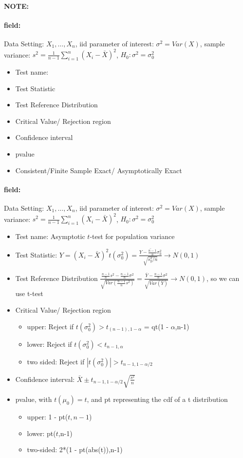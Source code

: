 \documentclass[12pt]{article}
\newenvironment{note}{\paragraph{NOTE:}}{}
\newenvironment{field}{\paragraph{field:}}{}
\begin{document}
\begin{note}
 \begin{field}
  Data Setting: $X_1, \ldots, X_n$, iid parameter of interest: $\sigma^2 = Var(X)$, sample variance: $s^2 = \frac{1}{n-1} \sum_{i=1}^n(X_i - \bar{X})^2$, $H_0: \sigma^2 = \sigma_0^2$
  \begin{itemize}
   \item Test name:
   \item Test Statistic
   \item Test Reference Distribution
   \item Critical Value/ Rejection region
   \item Confidence interval
   \item pvalue
   \item Consistent/Finite Sample Exact/ Asymptotically Exact
  \end{itemize}
 \end{field}
 \begin{field}
  Data Setting: $X_1, \ldots, X_n$, iid parameter of interest: $\sigma^2 = Var(X)$, sample variance: $s^2 = \frac{1}{n-1} \sum_{i=1}^n(X_i - \bar{X})^2$, $H_0: \sigma^2 = \sigma_0^2$
  \begin{itemize}
   \item Test name: Asymptotic $t$-test for population variance
   \item Test Statistic: $Y = (X_i - \bar{X})^2 t(\sigma_0^2)  = \frac{\bar{Y - \frac{n-1}{n}\sigma_0^2}}{\sqrt{s_y^2/n}} \to N(0,1)$
   \item Test Reference Distribution $ \frac{\frac{n-1}{n}s^2 - \frac{n-1}{n}\sigma^2}{\sqrt{Var(\frac{n-1}{n}s^2)}} = \frac{\bar{Y}- \frac{n-1}{n}\sigma^2}{\sqrt{Var(\bar{Y})}} \to N(0,1)$, so we can use t-test
   \item Critical Value/ Rejection region
         \begin{itemize}
          \item upper: Reject if $t(\sigma_0^2) > t_{(n-1),1-\alpha}$ = qt(1 - $\alpha$,n-1)
          \item lower: Reject if $t(\sigma_0^2)  < t_{n-1,\alpha}$
          \item two sided: Reject if $|t(\sigma_0^2)| > t_{n-1, 1 - \alpha/2}$
         \end{itemize}
   \item Confidence interval: $\bar{X} \pm t_{n-1,1-\alpha/2}\sqrt{\frac{s^2}{n}}$
   \item pvalue, with $t(\mu_0)  = t$, and pt representing the cdf of a t distribution
         \begin{itemize}
          \item upper: 1 - pt($t,n-1$)
          \item lower: pt($t$,n-1)
          \item two-sided: 2*(1 - pt(abs(t)),n-1)
         \end{itemize}
  \end{itemize}
 \end{field}
\end{note}
\end{document}

